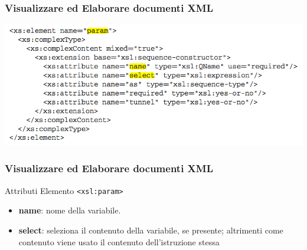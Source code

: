 \begin{frame}
    \frametitle{Visualizzare ed Elaborare documenti XML}
    \addtocounter{nframe}{1}
    
    \begin{center}
        \includegraphics[width=.95\textwidth]{imgs/Schema-param.png}
    \end{center}

\end{frame}

\begin{frame}
    \frametitle{Visualizzare ed Elaborare documenti XML}
    \addtocounter{nframe}{1}
    

     \begin{block}{Attributi Elemento \texttt{<xsl:param>}}
         \begin{itemize}
             \item \textbf{name}: nome della variabile.
             \item \textbf{select}: seleziona il contenuto della variabile, se presente; altrimenti come contenuto viene usato il contenuto dell’istruzione stessa
        \end{itemize}
     \end{block}
    
\end{frame}

